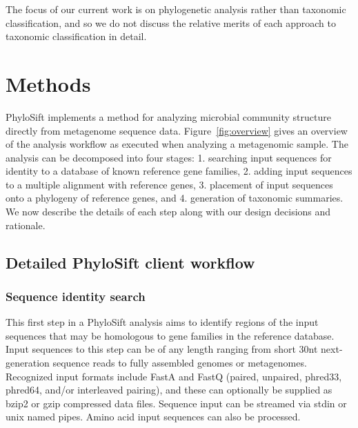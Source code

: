 \documentclass[10pt]{article}
\begin{document}
The focus of our current work is on phylogenetic analysis rather than taxonomic classification, and so we do not discuss the relative merits of each approach to taxonomic classification in detail.

\section*{Methods}

PhyloSift implements a method for analyzing microbial community structure directly from metagenome sequence data.
Figure~\ref{fig:overview} gives an overview of the analysis workflow as executed when analyzing a metagenomic sample.
The analysis can be decomposed into four stages: 1. searching input sequences for identity to a database of known reference gene families, 2. adding input sequences to a multiple alignment with reference genes, 3. placement of input sequences onto a phylogeny of reference genes, and 4. generation of taxonomic summaries. We now describe the details of each step along with our design decisions and rationale.
 

\subsection*{Detailed PhyloSift client workflow}
\subsubsection*{Sequence identity search}
This first step in a PhyloSift analysis aims to identify regions of the input sequences that may be homologous to gene families in the reference database.
Input sequences to this step can be of any length ranging from short 30nt next-generation sequence reads to fully assembled genomes or metagenomes.
Recognized input formats include FastA and FastQ (paired, unpaired, phred33, phred64, and/or interleaved pairing), and these can optionally be supplied as bzip2 or gzip compressed data files. 
Sequence input can be streamed via stdin or unix named pipes.
Amino acid input sequences can also be processed.
\end{document}
